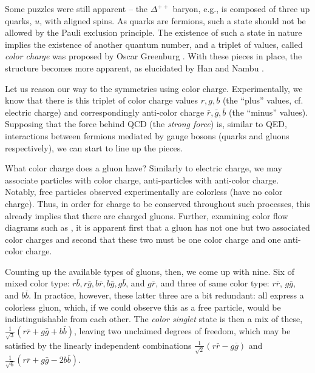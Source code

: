 Some puzzles were still apparent -- the $\Delta^{++}$ baryon, e.g., is composed of three up quarks, 
$u$, with aligned spins. As quarks are fermions, such a state should not be allowed by the Pauli exclusion 
principle. The existence of such a state in nature implies the existence of another quantum number, and 
a triplet of values, called \emph{color charge} was proposed by Oscar Greenburg . With these
pieces in place, the structure becomes more apparent, as elucidated by Han and Nambu .

Let us reason our way to the symmetries using color charge. Experimentally, we know that there is this triplet
of color charge values $r, g, b$ (the ``plus'' values, cf. electric charge) and correspondingly anti-color charge
$\bar{r}, \bar{g}, \bar{b}$ (the ``minus'' values). Supposing that the force behind QCD (the \emph{strong force}) is, 
similar to QED, interactions between fermions mediated by gauge bosons (quarks and gluons respectively), we can 
start to line up the pieces.

What color charge does a gluon have? Similarly to electric charge, we may associate particles
with color charge, anti-particles with anti-color charge. Notably, free particles observed experimentally are 
colorless (have no color charge). Thus, in order for charge to be conserved throughout such 
processes, this already implies that there are charged gluons. Further, examining color flow diagrams 
such as , it is apparent first that a gluon has not one but two associated color charges
and second that these two must be one color charge and one anti-color charge.

Counting up the available types of gluons, then, we come up with nine. Six of mixed color type: 
$r\bar{b}, r\bar{g}, b\bar{r}, b\bar{g}, g\bar{b}$, and $g\bar{r}$, and three of same color type:
$r\bar{r}$, $g\bar{g}$, and $b\bar{b}$. In practice, however, these latter three are a bit redundant:
all express a colorless gluon, which, if we could observe this as a free particle, would be indistinguishable
from each other. The \emph{color singlet} state is then a mix of these, $\frac{1}{\sqrt{3}}(r\bar{r}+g\bar{g}+b\bar{b})$,
leaving two unclaimed degrees of freedom, which may be satisfied by the linearly independent combinations
$\frac{1}{\sqrt{2}}(r\bar{r}-g\bar{g})$ and $\frac{1}{\sqrt{6}}(r\bar{r}+g\bar{g}-2b\bar{b})$.

